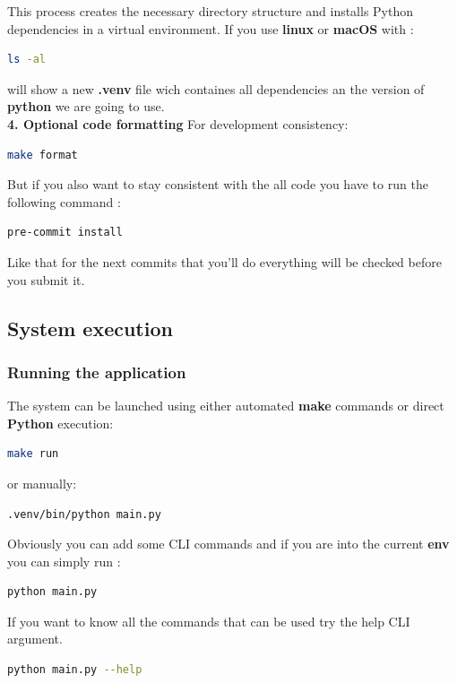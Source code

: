 This process creates the necessary directory structure and installs Python dependencies in a virtual environment.
If you use \textbf{linux} or \textbf{macOS} with :

\begin{lstlisting}[language=bash]
    ls -al
\end{lstlisting}
will show a new \textbf{.venv} file wich containes all dependencies an the version of \textbf{python} we are going to use.\\
\textbf{4. Optional code formatting}
For development consistency:

\begin{lstlisting}[language=bash]
    make format
\end{lstlisting}
But if you also want to stay consistent with the all code you have to run the following command :
\begin{lstlisting}[language=bash]
    pre-commit install
\end{lstlisting}
Like that for the next commits that you'll do everything will be checked before you submit it.

\subsection{System execution}

\subsubsection{Running the application}
The system can be launched using either automated \textbf{make} commands or direct \textbf{Python} execution:
\begin{lstlisting}[language=bash]
    make run
\end{lstlisting}

or manually:

\begin{lstlisting}[language=bash]
    .venv/bin/python main.py
\end{lstlisting}
Obviously you can add some CLI commands and if you are into the current \textbf{env} you can simply run :


\begin{lstlisting}[language=bash]
    python main.py
\end{lstlisting}
If you want to know all the commands that can be used try the help CLI argument.

\begin{lstlisting}[language=bash]
    python main.py --help
\end{lstlisting}


